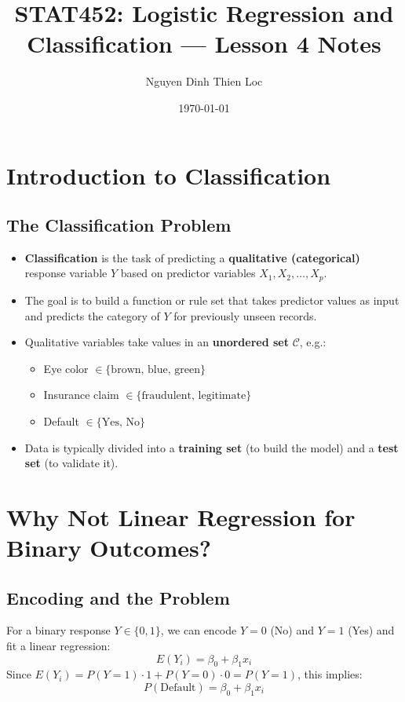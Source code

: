 \documentclass{article}
\title{STAT452: Logistic Regression and Classification --- Lesson 4 Notes}
\author{Nguyen Dinh Thien Loc}
\date{\today}
\begin{document}
\maketitle

\section{Introduction to Classification}

\subsection{The Classification Problem}
\begin{itemize}
    \item \textbf{Classification} is the task of predicting a \textbf{qualitative (categorical)} response variable $Y$ based on predictor variables $X_1, X_2, \dots, X_p$.
    \item The goal is to build a function or rule set that takes predictor values as input and predicts the category of $Y$ for previously unseen records.
    \item Qualitative variables take values in an \textbf{unordered set} $\mathcal{C}$, e.g.:
    \begin{itemize}
        \item Eye color $\in \{\text{brown, blue, green}\}$
        \item Insurance claim $\in \{\text{fraudulent, legitimate}\}$
        \item Default $\in \{\text{Yes, No}\}$
    \end{itemize}
    \item Data is typically divided into a \textbf{training set} (to build the model) and a \textbf{test set} (to validate it).
\end{itemize}

\section{Why Not Linear Regression for Binary Outcomes?}

\subsection{Encoding and the Problem}
For a binary response $Y \in \{0, 1\}$, we can encode $Y = 0$ (No) and $Y = 1$ (Yes) and fit a linear regression:
$$E(Y_i) = \beta_0 + \beta_1 x_i$$
Since $E(Y_i) = P(Y = 1) \cdot 1 + P(Y = 0) \cdot 0 = P(Y = 1)$, this implies:
$$P(\text{Default}) = \beta_0 + \beta_1 x_i$$
\end{document}
